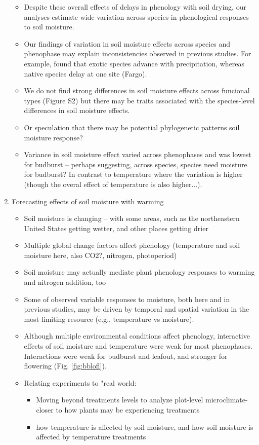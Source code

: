 \documentclass{article}
\begin{document}
\begin{enumerate}
\begin{itemize}
\item Despite these overall effects of delays in phenology with soil drying, our analyses estimate wide variation across species in phenological responses to soil moisture. 
\item Our findings of variation in soil moisture effects across species and phenophase may explain inconsistencies observed in previous studies. For example, \cite{wolkovich2012} found that exotic species advance with precipitation, whereas native species delay at one site (Fargo). 
\item We do not find strong differences in soil moisture effects across funcional types (Figure S2) but there may be traits associated with the species-level differences in soil moisture effects.  
\item Or speculation that there may be potential phylogenetic patterns soil moisture response?
\item Variance in soil moisture effect varied across phenophases and was lowest for budburst -- perhaps suggesting, across species, species need moisture for budburst? In contrast to temperature where the variation is higher (though the overal effect of temperature is also higher...). 
\end{itemize}
\item Forecasting effects of soil moisture with warming
\begin{itemize}
\item Soil moisture is changing -- with some areas, such as the northeastern United States getting wetter, and other places getting drier \citep{berg2017}
\item Multiple global change factors affect phenology (temperature and soil moisture here, also CO2?, nitrogen, photoperiod)
 \item Soil moisture may actually mediate plant phenology responses to warming and  nitrogen addition, too \citep{liu2022}
\item Some of observed variable responses to moisture, both here and in previous studies,  may be driven by temporal and spatial variation in the most limiting resource (e.g., temperature vs moisture). 
\item Although multiple environmental conditions affect phenology, interactive effects of soil moisture and temperature were weak for most phenophases. Interactions were weak for budburst and leafout, and stronger for flowering (Fig. \ref{fig:bblofl}).
\item Relating experiments to "real world: 
\begin{itemize}
\item Moving beyond treatments levels to analyze plot-level microclimate- closer to how plants may be experiencing treatments
\item how temperature is affected by soil moisture, and how soil moisture is affected by temperature treatments
\end{itemize}
\end{itemize}
\end{enumerate}
\end{document}
